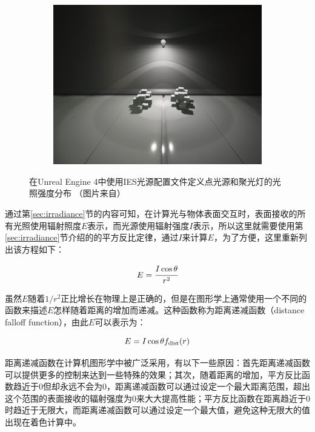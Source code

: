 \begin{figure}
\begin{fullwidth}
\begin{subfigure}[b]{0.247\thewidth}
	\end{subfigure}
	\begin{subfigure}[b]{0.293\thewidth}
		\includegraphics[width=1.\textwidth]{figures/intro/IES_04}
	\end{subfigure}
\caption{在Unreal Engine 4中使用IES光源配置文件定义点光源和聚光灯的光照强度分布 （图片来自\cite{m:IESLightProfiles}）}
\label{f:intro-ies}
\end{fullwidth}
\end{figure}

通过第\ref{sec:irradiance}节的内容可知，在计算光与物体表面交互时，表面接收的所有光照使用辐射照度$E$表示，而光源使用辐射强度$I$表示，所以这里就需要使用第\ref{sec:irradiance}节介绍的的平方反比定律，通过$I$来计算$E$，为了方便，这里重新列出该方程如下：

\begin{equation}
	E= \cfrac{I\cos\theta}{r^{2}}
\end{equation}

虽然$E$随着$1/r^{2}$正比增长在物理上是正确的，但是在图形学上通常使用一个不同的函数来描述$E$怎样随着距离的增加而递减。这种函数称为距离递减函数（distance falloff function），由此$E$可以表示为：

\begin{equation}
	E=I\cos\theta f_{\rm dist}(r)
\end{equation}

距离递减函数在计算机图形学中被广泛采用，有以下一些原因：首先距离递减函数可以提供更多的控制来达到一些特殊的效果；其次，随着距离的增加，平方反比函数趋近于$0$但却永远不会为$0$，距离递减函数可以通过设定一个最大距离范围，超出这个范围的表面接收的辐射强度为0来大大提高性能；平方反比函数在距离趋近于$0$时趋近于无限大，而距离递减函数可以通过设定一个最大值，避免这种无限大的值出现在着色计算中。


